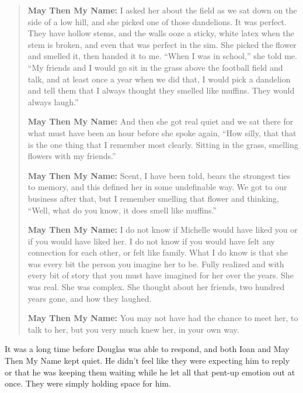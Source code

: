 \begin{quote}
\textbf{May Then My Name:} I asked her about the field as we sat down on the side of a low hill, and she picked one of those dandelions. It was perfect. They have hollow stems, and the walls ooze a sticky, white latex when the stem is broken, and even that was perfect in the sim. She picked the flower and smelled it, then handed it to me. ``When I was in school,'' she told me. ``My friends and I would go sit in the grass above the football field and talk, and at least once a year when we did that, I would pick a dandelion and tell them that I always thought they smelled like muffins. They would always laugh.''

\textbf{May Then My Name:} And then she got real quiet and we sat there for what must have been an hour before she spoke again, ``How silly, that that is the one thing that I remember most clearly. Sitting in the grass, smelling flowers with my friends.''

\textbf{May Then My Name:} Scent, I have been told, bears the strongest ties to memory, and this defined her in some undefinable way. We got to our business after that, but I remember smelling that flower and thinking, ``Well, what do you know, it does smell like muffins.''

\textbf{May Then My Name:} I do not know if Michelle would have liked you or if you would have liked her. I do not know if you would have felt any connection for each other, or felt like family. What I do know is that she was every bit the person you imagine her to be. Fully realized and with every bit of story that you must have imagined for her over the years. She was real. She was complex. She thought about her friends, two hundred years gone, and how they laughed.

\textbf{May Then My Name:} You may not have had the chance to meet her, to talk to her, but you very much knew her, in your own way.
\end{quote}

\noindent It was a long time before Douglas was able to respond, and both Ioan and May Then My Name kept quiet. He didn't feel like they were expecting him to reply or that he was keeping them waiting while he let all that pent-up emotion out at once. They were simply holding space for him.

